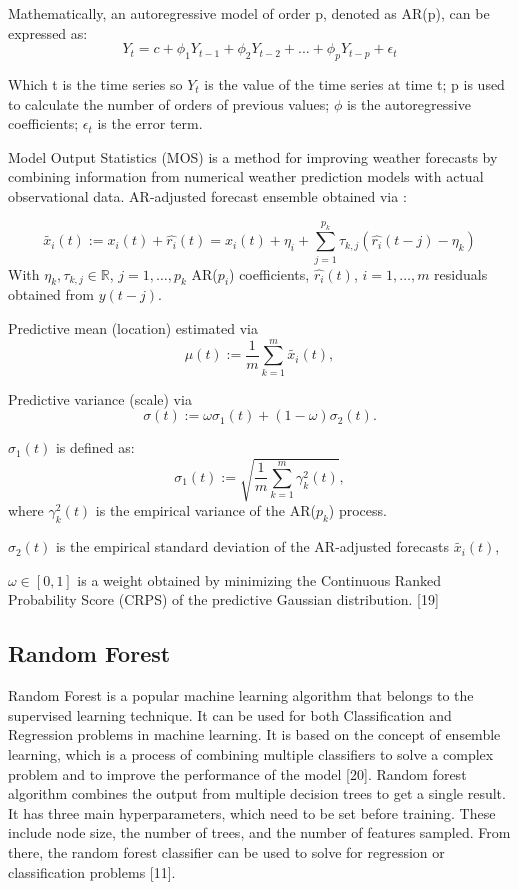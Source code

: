 \documentclass{ieeeojies}
\begin{document}
\indent Mathematically, an autoregressive model of order p, denoted as AR(p), can be expressed as:
\begin{dmath*}
 Y_t = c + \phi_1 Y_{t-1} + \phi_2 Y_{t-2} +...+ \phi_p Y_{t-p} + \epsilon_t 
 \end{dmath*}

Which t is the time series so \(Y_t\) is the value of the time series at time t; p is used to calculate the number of orders of previous values; \(\phi\) is the autoregressive coefficients; \(\epsilon_t\) is the error term.

\indent Model Output Statistics (MOS) is a method for improving weather forecasts by combining information from numerical weather prediction models with actual observational data. 
AR-adjusted forecast ensemble obtained via : 

\[\widetilde{x_i}(t) := x_i(t) + \widehat{r_i}(t) = x_i(t) + \eta_i + \sum_{j=1}^{p_k} \tau_{k,j} ( \widehat{r_i}(t - j) - \eta_k)
\]
With \(\eta_k, \tau_{k,j} \in \mathbb{R}\), \(j = 1, \ldots, p_k\) AR(\(p_i\)) coefficients, \(\widehat{r_i}(t)\),
\(i = 1, \ldots, m\) residuals obtained from \(y(t - j)\).

Predictive mean (location) estimated via
\[
\mu(t) := \frac{1}{m} \sum_{k=1}^{m} \widetilde{x_i}(t),
\]

Predictive variance (scale) via
\[
\sigma(t) := \omega \sigma_1(t) + (1 - \omega) \sigma_2(t).
\]

\(\sigma_1(t)\) is defined as:
\[
\sigma_1(t) := \sqrt{\frac{1}{m} \sum_{k=1}^{m} \gamma_k^2(t)},
\]
where \(\gamma_k^2(t)\) is the empirical variance of the AR(\(p_k\)) process.

\(\sigma_2(t)\) is the empirical standard deviation of the AR-adjusted forecasts \(\widetilde{x_i}(t)\),

\(\omega \in [0, 1]\) is a weight obtained by minimizing the Continuous Ranked Probability Score (CRPS) of the predictive Gaussian distribution. [19]

\subsection{Random Forest}
\indent Random Forest is a popular machine learning algorithm that belongs to the supervised learning technique. It can be used for both Classification and Regression problems in machine learning. It is based on the concept of ensemble learning, which is a process of combining multiple classifiers to solve a complex problem and to improve the performance of the model [20].
\indent Random forest algorithm combines the output from multiple decision trees to get a single result. It has three main hyperparameters, which need to be set before training. These include node size, the number of trees, and the number of features sampled. From there, the random forest classifier can be used to solve for regression or classification problems [11]. 
\end{document}
